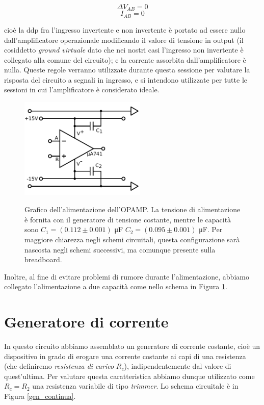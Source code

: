 \begin{equation}
\Delta V_{AB}=0
\label{eq:regola_V}
\end{equation}
\begin{equation}
I_{AB}=0
\label{eq:regola_I}
\end{equation}

cioè la ddp fra l'ingresso invertente e non invertente è portato ad essere nullo dall'amplificatore operazionale modificando il valore di tensione in output (il cosiddetto \textit{ground virtuale} dato che nei nostri casi l'ingresso non invertente è collegato alla comune del circuito); e la corrente assorbita dall'amplificatore è nulla.
Queste regole verranno utilizzate durante questa sessione per valutare la risposta del circuito a segnali in ingresso, e si intendono utilizzate per tutte le sessioni in cui l'amplificatore è considerato ideale.

\begin{figure}[ht]
 \centering
   {\includegraphics[width=6cm]{../E01/latex/alimentazione.pdf}}
 \caption{Grafico dell'alimentazione dell'OPAMP. La tensione di alimentazione è fornita con il generatore di tensione costante, mentre le capacità sono $C_1=(0.112 \pm 0.001)$ \si{\micro\farad} $C_2=(0.095\pm0.001)$ \si{\micro\farad}. Per maggiore chiarezza negli schemi circuitali, questa configurazione sarà nascosta negli schemi successivi, ma comunque presente sulla breadboard.}
 \label{gr:costante}
\end{figure}

Inoltre, al fine di evitare problemi di rumore durante l'alimentazione, abbiamo collegato l'alimentazione a due capacità come nello schema in Figura \ref{gr:costante}.

\section{Generatore di corrente}

In questo circuito abbiamo assemblato un generatore di corrente costante, cioè un dispositivo in grado di erogare una corrente costante ai capi di una resistenza (che definiremo \textit{resistenza di carico} $R_c$), indipendentemente dal valore di quest'ultima. Per valutare questa caratteristica abbiamo dunque utilizzato come $R_c=R_2$ una resistenza variabile di tipo \textit{trimmer}. Lo schema circuitale è in Figura \ref{gen_continua}.

